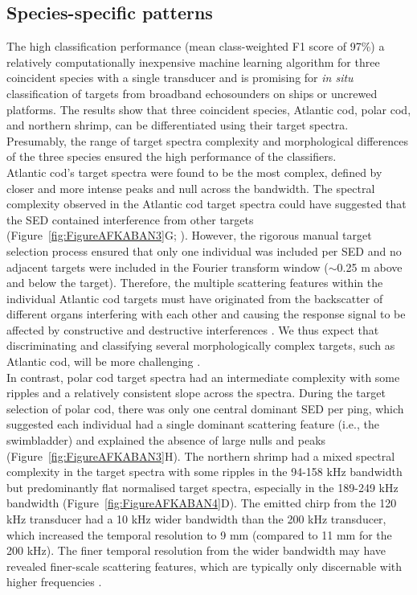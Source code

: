{\subsection{Species-specific patterns}
The high classification performance (mean class-weighted F1 score of 97\%) a relatively computationally inexpensive machine learning algorithm for three coincident species with a single transducer and is promising for \textit{in situ} classification of targets from broadband echosounders on ships or uncrewed platforms. The results show that three coincident species, Atlantic cod, polar cod, and northern shrimp, can be differentiated using their target spectra. Presumably, the range of target spectra complexity and morphological differences of the three species ensured the high performance of the classifiers. \\
Atlantic cod's target spectra were found to be the most complex, defined by closer and more intense peaks and null across the bandwidth. The spectral complexity observed in the Atlantic cod target spectra could have suggested that the SED contained interference from other targets (Figure~\ref{fig:FigureAFKABAN3}G; \citealt{Khodabandeloo2021, Stanton1996}). However, the rigorous manual target selection process ensured that only one individual was included per SED and no adjacent targets were included in the Fourier transform window ($\sim$0.25 m above and below the target). Therefore, the multiple scattering features within the individual Atlantic cod targets must have originated from the backscatter of different organs interfering with each other and causing the response signal to be affected by constructive and destructive interferences \citep{Demer2017, Reeder2004}. We thus expect that discriminating and classifying several morphologically complex targets, such as Atlantic cod, will be more challenging \citep{Au2003, Clay1991, Clay1992}. \\
In contrast, polar cod target spectra had an intermediate complexity with some ripples and a relatively consistent slope across the spectra. During the target selection of polar cod, there was only one central dominant SED per ping, which suggested each individual had a single dominant scattering feature (i.e., the swimbladder) and explained the absence of large nulls and peaks (Figure~\ref{fig:FigureAFKABAN3}H). The northern shrimp had a mixed spectral complexity in the target spectra with some ripples in the 94-158 kHz bandwidth but predominantly flat normalised target spectra, especially in the 189-249 kHz bandwidth (Figure~\ref{fig:FigureAFKABAN4}D). The emitted chirp from the 120 kHz transducer had a 10 kHz wider bandwidth than the 200 kHz transducer, which increased the temporal resolution to 9 mm (compared to 11 mm for the 200 kHz). The finer temporal resolution from the wider bandwidth may have revealed finer-scale scattering features, which are typically only discernable with higher frequencies \citep{Reeder2004}.\\
}
